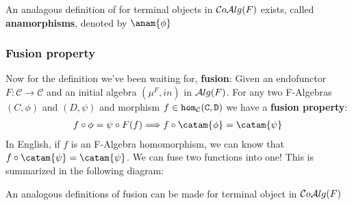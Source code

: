 An analagous definition of for terminal objects in $\mathcal{C}o\mathcal{A}lg(F)$ exists, called \textbf{anamorphisms}, denoted by $\anam{\phi}$

\subsubsection{Fusion property}
Now for the definition we've been waiting for, \textbf{fusion}:
Given an endofunctor $F:\mathcal{C}\to\mathcal{C}$ and an initial algebra $(\mu^F,in)$ in $\mathcal{A}lg(F)$. For any two F-Algebras $(C,\phi)$ and $(D,\psi)$ and morphism $f\in\tt{hom}_\mathcal{C}(C,D)$ we have a \textbf{fusion property}: \begin{align*} f\circ\phi=\psi\circ F(f) \Longrightarrow f\circ\catam{\phi}=\catam{\psi} \end{align*}
In English, if $f$ is an F-Algebra homomorphism, we can know that $f\circ\catam{\psi}=\catam{\psi}$. We can fuse two functions into one! This is summarized in the following diagram:
\begin{figure}[H]\vspace{-1em}\hfill
{}\hfill\null
\end{figure}\vspace{-1em}
An analogous definitions of fusion can be made for terminal object in $\mathcal{C}o\mathcal{A}lg(F)$




